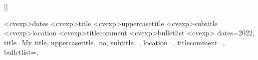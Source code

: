 \newcommand{\sectitlefontsize}{
  12
}

\setcounter{secnumdepth}{0}

\titleformat{\section}{
  \fontsize{\sectitlefontsize pt}{\sectitlefontsize pt}
  \color{titletxt}
  \bfseries
  \raggedleft
}{\thesection}{0em}{\textls[\sectitlestretch]}[]

\titlespacing*{\section}{0pt}{0pt}{0pt}


\newcommand{\datesstyle}[1]{
    \textbf{#1}
}

\newcommand{\titlestyle}[1]{
    \textcolor{bodytxt}{\textbf{#1}}
}

\newcommand{\subtitlestyle}[1]{
    \ifthenelse{\equal{#1}{}}
    {
        \vspace{-\baselineskip}
    }{\textcolor{subhltxt}{\textit{\textbf{#1}}}}
}

\newcommand{\locationstyle}[1]{
    \ifthenelse{\equal{#1}{}}
    {}{\textit{#1}}
}

\newcommand{\titlecommentstyle}[1]{
    \ifthenelse{\equal{#1}{}}
    {
        \vspace{-\baselineskip}
    }{\raggedright #1}
}

\newcommand{\bulletliststyle}[1]{
    \ifthenelse{\equal{#1}{}}{}{
        \readlist\mylist{#1}%
        \begin{itemize} 
            \foreachitem\z\in\mylist[]{
                \item \raggedright \z
            }
        \end{itemize}
        \bulletpadding
    }
}


\DeclareOptionX<cvexp>{dates}{\def\dates{#1}}
\DeclareOptionX<cvexp>{title}{\def\title{#1}}
\DeclareOptionX<cvexp>{uppercasetitle}{\def\uppercasetitle{#1}}
\DeclareOptionX<cvexp>{subtitle}{\def\subtitle{#1}}
\DeclareOptionX<cvexp>{location}{\def\location{#1}}
\DeclareOptionX<cvexp>{titlecomment}{\def\titlecomment{#1}}
\DeclareOptionX<cvexp>{bulletlist}{\def\bulletlist{#1}}
\ExecuteOptionsX<cvexp>{
    dates=2022,
    title=My title,
    uppercasetitle=no,
    subtitle=,
    location=,
    titlecomment=,
    bulletlist={},
}

